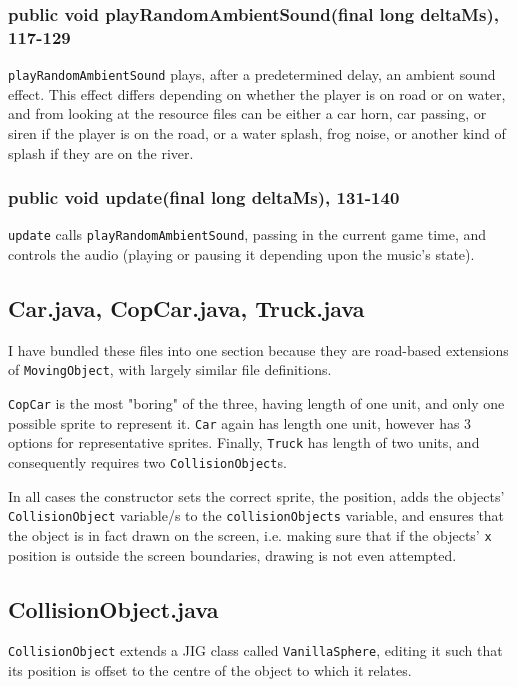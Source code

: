 \documentclass[12pt]{article}
\begin{document}
\subsubsection{public void playRandomAmbientSound(final long deltaMs), 117-129}
\verb|playRandomAmbientSound| plays, after a predetermined delay, an ambient sound effect.
This effect differs depending on whether the player is on road or on water, and from looking at the resource files can be either a car horn, car passing, or siren if the player is on the road, or a water splash, frog noise, or another kind of splash if they are on the river.

\subsubsection{public void update(final long deltaMs), 131-140}
\verb|update| calls \verb|playRandomAmbientSound|, passing in the current game time, and controls the audio (playing or pausing it depending upon the music's state).

\subsection{Car.java, CopCar.java, Truck.java}
I have bundled these files into one section because they are road-based extensions of \verb|MovingObject|, with largely similar file definitions.

\verb|CopCar| is the most "boring" of the three, having length of one unit, and only one possible sprite to represent it.
\verb|Car| again has length one unit, however has 3 options for representative sprites.
Finally, \verb|Truck| has length of two units, and consequently requires two \verb|CollisionObject|s.

In all cases the constructor sets the correct sprite, the position, adds the objects' \verb|CollisionObject| variable/s to the \verb|collisionObjects| variable, and ensures that the object is in fact drawn on the screen, i.e. making sure that if the objects' \verb|x| position is outside the screen boundaries, drawing is not even attempted.

\subsection{CollisionObject.java}
\verb|CollisionObject| extends a JIG class called \verb|VanillaSphere|, editing it such that its position is offset to the centre of the object to which it relates.
\end{document}

